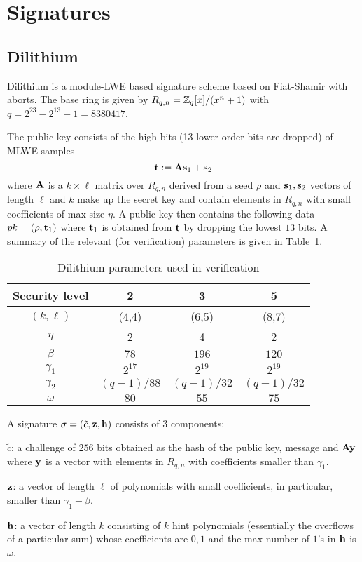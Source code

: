 \section{Signatures}
\label{section:signatures}
 
\subsection{Dilithium}

Dilithium is a module-LWE based signature scheme based on Fiat-Shamir with aborts.  The base ring is given 
by $R_{q,n} = \mathbb{Z}_q[x]/(x^n+1)$ with $q = 2^{23} - 2^{13} - 1 = 8380417$.

The public key consists of the high bits (13 lower order bits are dropped) of MLWE-samples
\[ \mathbf{t} :=  \mathbf{A} \mathbf{s}_1 + \mathbf{s}_2 \]
where $\mathbf{A}$ is a $k \times \ell$  matrix over $R_{q,n}$ derived from a seed $\rho$ 
and $\mathbf{s}_1, \mathbf{s}_2$ vectors of length $\ell$ and $k$ make up the secret key and 
contain elements in $R_{q,n}$ with small coefficients of max size $\eta$.
A public key then contains the following data $pk = (\rho, \mathbf{t}_1)$ where $\mathbf{t}_1$
is obtained from $\mathbf{t}$ by dropping the lowest $13$ bits.
A summary of the relevant (for verification) parameters is given in Table~\ref{tab:dilithium}.

\begin{table}\caption{Dilithium parameters used in verification}\label{tab:dilithium}
\begin{center}
\begin{tabular}{c|c|c|c}
\hline
Security level & 2 & 3 & 5 \\
\hline
$(k,\ell)$ & (4,4) & (6,5) & (8,7) \\
$\eta$ & 2 & 4 & 2 \\
$\beta$ & $78$ & $196$ & $120$ \\
$\gamma_1$ & $2^{17}$ & $2^{19}$ & $2^{19}$ \\ 
$\gamma_2$ & $(q-1)/88$ & $(q-1)/32$ & $(q-1)/32$ \\
$\omega$ & $80$ & $55$ & $75$ \\
\hline
\end{tabular}
\end{center}
\end{table}

A signature $\sigma = (\tilde{c}, \mathbf{z}, \mathbf{h})$ consists of 3 components:
\bit
\item $\tilde{c}$: a challenge of $256$ bits obtained as the hash of the public key, message and $\mathbf{A} \mathbf{y}$ where $\mathbf{y}$
is a vector with elements in $R_{q,n}$ with coefficients smaller than $\gamma_1$. 
\item $\mathbf{z}$: a vector of length $\ell$ of polynomials with small coefficients, in particular, smaller than $\gamma_1 - \beta$.
\item $\mathbf{h}$: a vector of length $k$ consisting of $k$ hint polynomials (essentially the overflows of a particular sum) whose
coefficients are ${0,1}$ and the max number of $1$'s in $\mathbf{h}$ is $\omega$.
\eit

